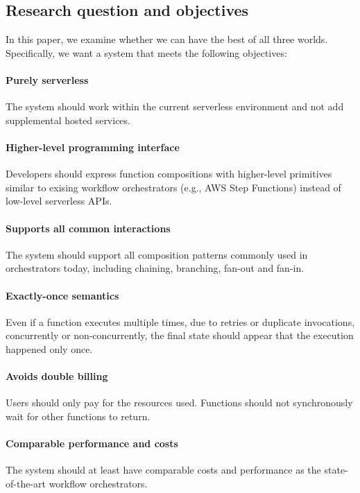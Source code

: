 \subsection{Research question and objectives}

In this paper, we examine whether we can have the best of all three worlds.
Specifically, we want a system that meets the following objectives:

\paragraph{Purely serverless} The system should work within the current
serverless environment and not add supplemental hosted services.

\paragraph{Higher-level programming interface} Developers should express
function compositions with higher-level primitives similar to exising workflow
orchestrators (e.g., AWS Step Functions) instead of low-level serverless APIs.

\paragraph{Supports all common interactions} The system should support all
composition patterns commonly used in orchestrators today, including chaining,
branching, fan-out and fan-in.

\paragraph{Exactly-once semantics} Even if a function executes multiple times,
due to retries or duplicate invocations, concurrently or non-concurrently, the
final state should appear that the execution happened only once.

\paragraph{Avoids double billing} Users should only pay for the resources
used. Functions should not synchronously wait for other functions to return.

\paragraph{Comparable performance and costs} The system should at least have
comparable costs and performance as the state-of-the-art workflow
orchestrators.



